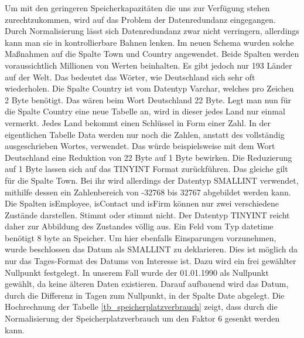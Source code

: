 Um mit den geringeren Speicherkapazitäten die uns zur Verfügung stehen zurechtzukommen, wird auf das Problem der Datenredundanz eingegangen. Durch Normalisierung lässt sich Datenredundanz zwar nicht verringern, allerdings kann man sie in kontrollierbare Bahnen lenken. Im neuen Schema wurden solche Maßnahmen auf die Spalte Town und Country angewendet. Beide Spalten werden voraussichtlich Millionen von Werten beinhalten. Es gibt jedoch nur 193 Länder auf der Welt. Das bedeutet das Wörter, wie Deutschland sich sehr oft wiederholen. Die Spalte Country ist vom Datentyp Varchar, welches pro Zeichen 2 Byte benötigt. Das wären beim Wort Deutschland 22 Byte. Legt man nun für die Spalte Country eine neue Tabelle an, wird in dieser jedes Land nur einmal vermerkt. Jedes Land bekommt einen Schlüssel in Form einer Zahl. In der eigentlichen Tabelle Data werden nur noch die Zahlen, anstatt des vollständig ausgeschrieben Wortes, verwendet. Das würde beispielsweise mit dem Wort Deutschland eine Reduktion von 22 Byte auf 1 Byte bewirken. Die Reduzierung auf 1 Byte lassen sich auf das TINYINT Format zurückführen. Das gleiche gilt für die Spalte Town. Bei ihr wird allerdings der Datentyp SMALLINT verwendet, mithilfe dessen ein Zahlenbereich von -32768 bis 32767 abgebildet werden kann. Die Spalten isEmployee, isContact und isFirm können nur zwei verschiedene Zustände darstellen. Stimmt oder stimmt nicht. Der Datentyp TINYINT reicht daher zur Abbildung des Zustandes völlig aus. Ein Feld vom Typ datetime benötigt 8 byte an Speicher. Um hier ebenfalls Einsparungen vorzunehmen, wurde beschlossen das Datum als SMALLINT zu deklarieren. Dies ist möglich da nur das Tages-Format des Datums von Interesse ist. Dazu wird ein frei gewählter Nullpunkt festgelegt. In unserem Fall wurde der 01.01.1990 als Nullpunkt gewählt, da keine älteren Daten existieren. Darauf aufbauend wird das Datum, durch die Differenz in Tagen zum Nullpunkt, in der Spalte Date abgelegt. Die Hochrechnung der Tabelle \ref{tb_speicherplatzverbrauch} zeigt, dass durch die Normalisierung der Speicherplatzverbrauch um den Faktor 6 gesenkt werden kann.

